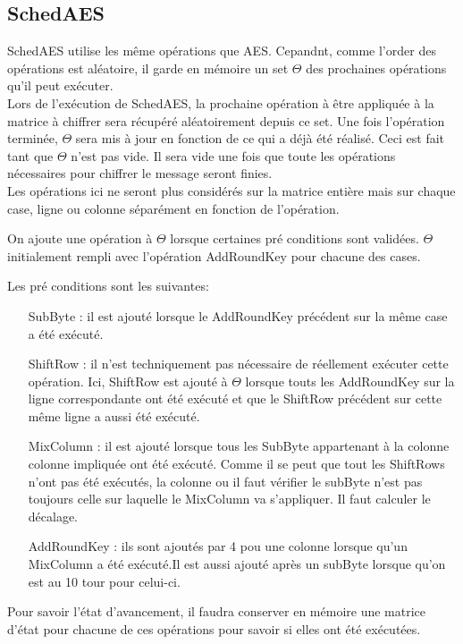 \documentclass[letterpaper]{article}
\begin{document}
\subsection{SchedAES}
SchedAES utilise les même opérations que AES. Cepandnt, comme l'order des opérations est aléatoire, il garde en mémoire un set $\Theta$ des prochaines opérations qu'il peut exécuter.\\

Lors de l'exécution de SchedAES, la prochaine opération à être appliquée à la matrice à chiffrer sera récupéré aléatoirement depuis ce set.
Une fois l'opération terminée, $\Theta$ sera mis à jour en fonction de ce qui a déjà été réalisé.
Ceci est fait tant que $\Theta$ n'est pas vide.
Il sera vide une fois que toute les opérations nécessaires pour chiffrer le message seront finies.\\

Les opérations ici ne seront plus considérés sur la matrice entière mais sur chaque case, ligne ou colonne séparément en fonction de l'opération.

On ajoute une opération à $\Theta$ lorsque certaines pré conditions sont validées.
$\Theta$ initialement rempli avec l'opération AddRoundKey pour chacune des cases.

Les pré conditions sont les suivantes:
\begin{itemize}
    \item[SubByte :] il est ajouté lorsque le AddRoundKey précédent sur la même case a été exécuté.
    \item[ShiftRow :] il n'est techniquement pas nécessaire de réellement exécuter cette opération. Ici, ShiftRow est ajouté à $\Theta$ lorsque touts les AddRoundKey sur la ligne correspondante ont été exécuté et que le ShiftRow précédent sur cette même ligne a aussi été exécuté.
    \item[MixColumn :] il est ajouté lorsque tous les SubByte appartenant à la colonne colonne impliquée ont été exécuté. Comme il se peut que tout les ShiftRows n'ont pas été exécutés, la colonne ou il faut vérifier le subByte n'est pas toujours celle sur laquelle le MixColumn va s'appliquer. Il faut calculer le décalage.
    \item[AddRoundKey :] ils sont ajoutés par 4 pou une colonne lorsque qu'un MixColumn a été exécuté.Il est aussi ajouté après un subByte lorsque qu'on est au 10 tour pour celui-ci.\\
\end{itemize}

Pour savoir l'état d'avancement, il faudra conserver en mémoire une matrice d'état pour chacune de ces opérations pour savoir si elles ont été exécutées.
\end{document}
